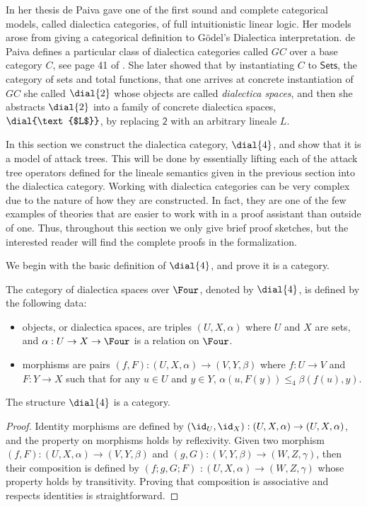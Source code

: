 In her thesis de Paiva \cite{dePaiva:1987} gave one of the first sound
and complete categorical models, called dialectica categories, of full
intuitionistic linear logic.  Her models arose from giving a
categorical definition to G\"odel's Dialectica interpretation.  de
Paiva defines a particular class of dialectica categories called $GC$
over a base category $C$, see page 41 of \cite{dePaiva:1987}.  She
later showed that by instantiating $C$ to $\mathsf{Sets}$, the
category of sets and total functions, that one arrives at concrete
instantiation of $GC$ she called $\dial{2}$ whose objects are called
\emph{dialectica spaces}, and then she abstracts $\dial{2}$ into a
family of concrete dialectica spaces, $\dial{\text{$L$}}$, by
replacing $\mathsf{2}$ with an arbitrary lineale $L$.

In this section we construct the dialectica category, $\dial{4}$, and
show that it is a model of attack trees.  This will be done by
essentially lifting each of the attack tree operators defined for the
lineale semantics given in the previous section into the dialectica
category.  Working with dialectica categories can be very complex due
to the nature of how they are constructed.  In fact, they are one of
the few examples of theories that are easier to work with in a proof
assistant than outside of one.  Thus, throughout this section we only
give brief proof sketches, but the interested reader will find the
complete proofs in the formalization.

We begin with the basic definition of $\dial{4}$, and prove it is a
category.
\begin{definition}
  \label{def:dialectica-model}
  The category of dialectica spaces over $\Four$, denoted by
  $\dial{4}$, is defined by the following data:
  \begin{itemize}
  \item objects, or dialectica spaces, are triples $(U, X, \alpha)$
    where $U$ and $X$ are sets, and $\alpha : U \to X \to \Four$ is a
    relation on $\Four$.

  \item morphisms are pairs $(f,F) : (U,X,\alpha) \to (V,Y,\beta)$
    where $f : U \to V$ and $F : Y \to X$ such that for any $u \in U$
    and $y \in Y$, $\alpha(u,F(y)) \leq_4 \beta(f(u),y)$.
  \end{itemize}
\end{definition}

\begin{lemma}
  \label{lemma:dial4_is_a_category}
  The structure $\dial{4}$ is a category.
\end{lemma}
\begin{proof}
  Identity morphisms are defined by $(\id_U, \id_X) : (U , X , \alpha)
  \to (U , X, \alpha)$, and the property on morphisms holds by
  reflexivity.  Given two morphism $(f, F) : (U , X, \alpha) \to (V ,
  Y , \beta)$ and $(g, G) : (V , Y, \beta) \to (W , Z, \gamma)$, then
  their composition is defined by $(f;g, G;F) $ $: (U , X , \alpha) \to
  (W , Z , \gamma)$ whose property holds by transitivity.  Proving
  that composition is associative and respects identities is
  straightforward.
\end{proof}

